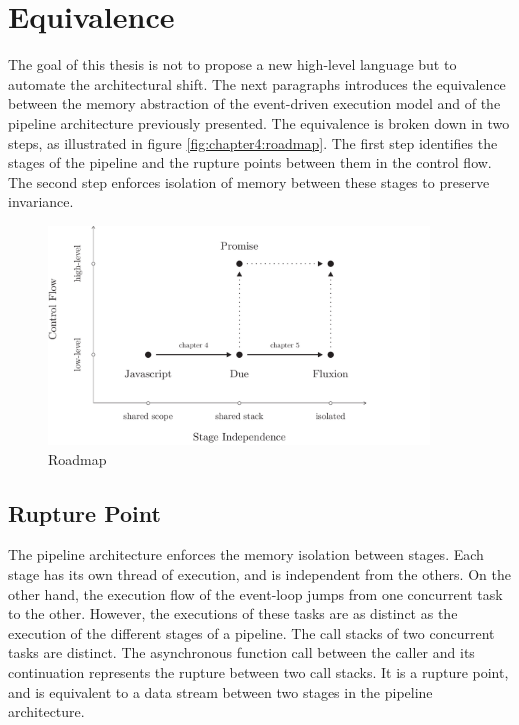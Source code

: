 \section{Equivalence} \label{chapter4:equivalence}

The goal of this thesis is not to propose a new high-level language but to automate the architectural shift.
The next paragraphs introduces the equivalence between the memory abstraction of the event-driven execution model and of the pipeline architecture previously presented.
The equivalence is broken down in two steps, as illustrated in figure \ref{fig:chapter4:roadmap}.
The first step identifies the stages of the pipeline and the rupture points between them in the control flow.
The second step enforces isolation of memory between these stages to preserve invariance.

\begin{figure}[h!]
\begin{center}
\includegraphics[width=0.9\textwidth]{../resources/roadmap.pdf}
\end{center}
\caption{Roadmap}
\label{fig:roadmap}
\end{figure}

\subsection{Rupture Point}

The pipeline architecture enforces the memory isolation between stages.
Each stage has its own thread of execution, and is independent from the others.
On the other hand, the execution flow of the event-loop jumps from one concurrent task to the other.
However, the executions of these tasks are as distinct as the execution of the different stages of a pipeline.
The call stacks of two concurrent tasks are distinct.
The asynchronous function call between the caller and its continuation represents the rupture between two call stacks.
It is a rupture point, and is equivalent to a data stream between two stages in the pipeline architecture.

